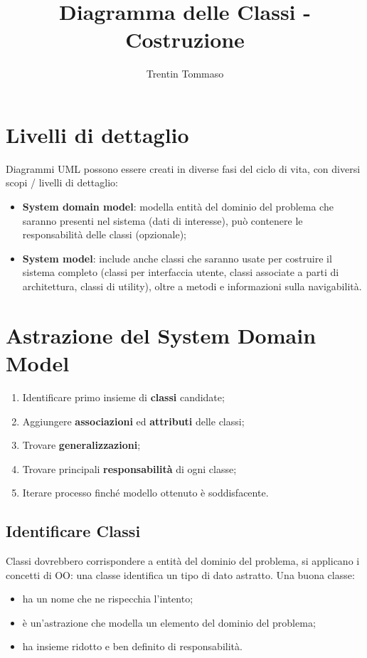 \documentclass{article}
\title{Diagramma delle Classi - Costruzione}
\author{Trentin Tommaso}
\begin{document}
  \maketitle
  \tableofcontents
  \newpage
  
  \section{Livelli di dettaglio}
    Diagrammi UML possono essere creati in diverse fasi del ciclo di vita, con diversi scopi / livelli di dettaglio:
    \begin{itemize}
      \item \textbf{System domain model}: modella entità del dominio del problema che saranno presenti nel sistema (dati di interesse), può contenere le responsabilità delle classi (opzionale); 
      \item \textbf{System model}: include anche classi che saranno usate per costruire il sistema completo (classi per interfaccia utente, classi associate a parti di architettura, classi di utility), oltre a metodi e informazioni sulla navigabilità. 
    \end{itemize}
  \section{Astrazione del System Domain Model}
    \begin{enumerate}
      \item Identificare primo insieme di \textbf{classi} candidate; 
      \item Aggiungere \textbf{associazioni} ed \textbf{attributi} delle classi;
      \item Trovare \textbf{generalizzazioni};
      \item Trovare principali \textbf{responsabilità} di ogni classe;
      \item Iterare processo finché modello ottenuto è soddisfacente.
    \end{enumerate}
    \subsection{Identificare Classi}
      Classi dovrebbero corrispondere a entità del dominio del problema, si applicano i concetti di OO: una classe identifica un tipo di dato astratto. Una buona classe:
      \begin{itemize}
        \item ha un nome che ne rispecchia l'intento; 
        \item è un'astrazione che modella un elemento del dominio del problema;
        \item ha insieme ridotto e ben definito di responsabilità.
      \end{itemize}
\end{document}
